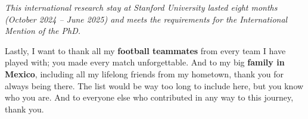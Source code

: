 \textit{This international research stay at Stanford University lasted eight months (October 2024 – June 2025) and meets the requirements for the International Mention of the PhD.}

Lastly, I want to thank all my \textbf{football teammates} from every team I have played with; you made every match unforgettable. And to my big \textbf{family in Mexico}, including all my lifelong friends from my hometown, thank you for always being there. The list would be way too long to include here, but you know who you are. And to everyone else who contributed in any way to this journey, thank you.

